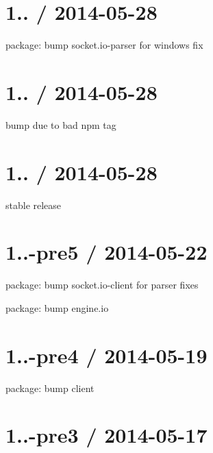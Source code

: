 \section*{1.. / 2014-\/05-\/28 }


\begin{DoxyItemize}
\item package\+: bump {\ttfamily socket.\+io-\/parser} for windows fix
\end{DoxyItemize}

\section*{1.. / 2014-\/05-\/28 }


\begin{DoxyItemize}
\item bump due to bad npm tag
\end{DoxyItemize}

\section*{1.. / 2014-\/05-\/28 }


\begin{DoxyItemize}
\item stable release
\end{DoxyItemize}

\section*{1..-\/pre5 / 2014-\/05-\/22 }


\begin{DoxyItemize}
\item package\+: bump {\ttfamily socket.\+io-\/client} for parser fixes
\item package\+: bump {\ttfamily engine.\+io}
\end{DoxyItemize}

\section*{1..-\/pre4 / 2014-\/05-\/19 }


\begin{DoxyItemize}
\item package\+: bump client
\end{DoxyItemize}

\section*{1..-\/pre3 / 2014-\/05-\/17 }


